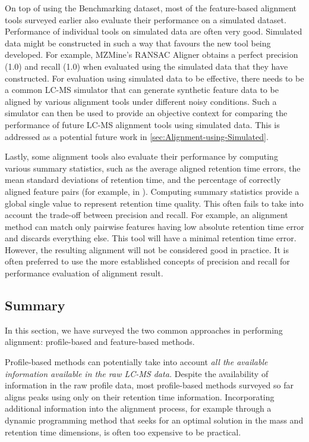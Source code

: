 On top of using the Benchmarking dataset, most of the feature-based alignment tools surveyed earlier also evaluate their performance on a simulated dataset. Performance of individual tools on simulated data are often very good. Simulated data might be constructed in such a way that favours the new tool being developed. For example, MZMine's RANSAC Aligner \cite{Pluskal2010} obtains a perfect precision (1.0) and recall (1.0) when evaluated using the simulated data that they have constructed. For evaluation using simulated data to be effective, there needs to be a common LC-MS simulator that can generate synthetic feature data to be aligned by various alignment tools under different noisy conditions. Such a simulator can then be used to provide an objective context for comparing the performance of future LC-MS alignment tools using simulated data. This is addressed as a potential future work in \ref{sec:Alignment-using-Simulated}.

Lastly, some alignment tools also evaluate their performance by computing various summary statistics, such as the average aligned retention time errors, the mean standard deviations of retention time, and the percentage of correctly aligned feature pairs (for example, in \cite{Lin2013,Podwojski2009}). Computing summary statistics provide a global single value to represent retention time quality. This often fails to take into account the trade-off between precision and recall. For example, an alignment method can match only pairwise features having low absolute retention time error and discards everything else. This tool will have a minimal retention time error. However, the resulting alignment will not be considered good in practice. It is often preferred to use the more established concepts of precision and recall for performance evaluation of alignment result.

\subsection{Summary}

In this section, we have surveyed the two common approaches in performing
alignment: profile-based and feature-based methods.

Profile-based methods can potentially take into account \emph{all the available information available in the raw LC-MS data.} Despite the availability of information in the raw profile data, most profile-based methods surveyed so far aligns peaks using only on their retention time information. Incorporating additional information into the alignment process, for example through a dynamic programming method that seeks for an optimal solution in the mass and retention time dimensions, is often too expensive to be practical.

